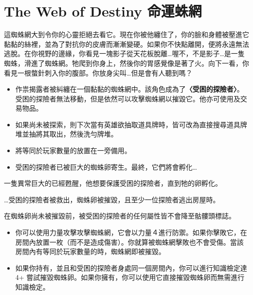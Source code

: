 
\chapter{The Web of Destiny 命運蛛網}

\begin{HauntStory}
  這蜘蛛網大到令你的心靈拒絕去看它。現在你被他纏住了，你的臉和身體被壓進它黏黏的絲裡，並為了對抗你的皮膚而漸漸變硬。如果你不快點離開，便將永遠無法逃脫。在你視野的邊緣，你看見一塊影子從天花板脫離…喔不，不是影子…是一隻蜘蛛，滑進了蜘蛛網。牠爬到你身上，然後你的胃感覺像是著了火。向下一看，你看見一根螫針刺入你的腹部。你放身尖叫…但是會有人聽到嗎？
\end{HauntStory}


\vspace*{-1em}
\begin{itemize}
  \item 作祟揭露者被糾纏在一個黏黏的蜘蛛網中。該角色成為了\textbf{〈受困的探險者〉}。受困的探險者無法移動，但是依然可以攻擊蜘蛛網以摧毀它。他亦可使用及交易物品。
  \item 如果尚未被探索，則下次當有英雄欲抽取道具牌時，皆可改為直接搜尋道具牌堆並抽將其取出，然後洗勻牌堆。
  \item 將等同於玩家數量的放置在一旁備用。
  \item 受困的探險者已被巨大的蜘蛛卵寄生。最終，它們將會孵化…
\end{itemize}

一隻異常巨大的已經甦醒，他想要保護受困的探險者，直到牠的卵孵化。

…受困的探險者被救出，蜘蛛卵被摧毀，且至少一位探險者逃出房屋時。

\vfill\null\pagebreak

在蜘蛛卵尚未被摧毀前，被受困的探險者的任何屬性皆不會降至骷髏頭標誌。
\begin{itemize}
  \item 你可以使用力量攻擊攻擊蜘蛛網，它會以力量４進行防禦。如果你擊敗它，在房間內放置一枚（而不是造成傷害）。你就算被蜘蛛網擊敗也不會受傷。當該房間內有等同於玩家數量的時，蜘蛛網即被摧毀。
  \item 如果你持有，並且和受困的探險者身處同一個房間內，你可以進行知識檢定達 4+ 嘗試摧毀蜘蛛卵。如果你擁有，你可以使用它直接摧毀蜘蛛卵而無需進行知識檢定。
\end{itemize}

